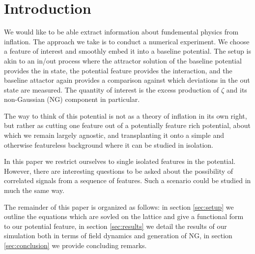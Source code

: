 
\section{Introduction} \label{sec:intro}


We would like to be able extract information about fundemental physics from inflation.
The approach we take is to conduct a numerical experiment.
We choose a feature of interest and smoothly embed it into a baseline potential.
The setup is akin to an in/out process where the attractor solution of the baseline potential provides the in state, the potential feature provides the interaction, and the baseline attactor again provides a comparison against which deviations in the out state are measured.
The quantity of interest is the excess production of $\zeta$ and its non-Gaussian (NG) component in particular.

The way to think of this potential is not as a theory of inflation in its own right, but rather as cutting one feature out of a potentially feature rich potential, about which we remain largely agnostic, and transplanting it onto a simple and otherwise featureless background where it can be studied in isolation.

In this paper we restrict ourselves to single isolated features in the potential. However, there are interesting questions to be asked about the possibility of correlated signals from a sequence of features. Such a scenario could be studied in much the same way.


The remainder of this paper is organized as follows: in section \ref{sec:setup} we outline the equations which are sovled on the lattice and give a functional form to our potential feature, in section \ref{sec:results} we detail the results of our simulation both in terms of field dynamics and generation of NG, in section \ref{sec:conclusion} we provide concluding remarks.
